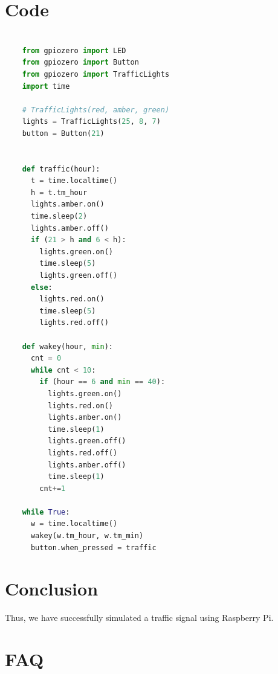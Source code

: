 \documentclass[11pt]{article}
\begin{document}
\section{Code}
\begin{lstlisting}[language=python]

	from gpiozero import LED
	from gpiozero import Button
	from gpiozero import TrafficLights
	import time
	
	# TrafficLights(red, amber, green)
	lights = TrafficLights(25, 8, 7)
	button = Button(21)
	
	
	def traffic(hour):
	  t = time.localtime()
	  h = t.tm_hour
	  lights.amber.on()
	  time.sleep(2)
	  lights.amber.off()
	  if (21 > h and 6 < h):
		lights.green.on()
		time.sleep(5)
		lights.green.off()
	  else:
		lights.red.on()
		time.sleep(5)
		lights.red.off()
	
	def wakey(hour, min):
	  cnt = 0
	  while cnt < 10:
		if (hour == 6 and min == 40):
		  lights.green.on()
		  lights.red.on()
		  lights.amber.on()
		  time.sleep(1)
		  lights.green.off()
		  lights.red.off()
		  lights.amber.off()
		  time.sleep(1)
		cnt+=1
	
	while True:
	  w = time.localtime()
	  wakey(w.tm_hour, w.tm_min)
	  button.when_pressed = traffic
\end{lstlisting}
\section{Conclusion}
Thus, we have successfully simulated a traffic signal using Raspberry Pi.
\clearpage

\section{FAQ}
\end{document}
